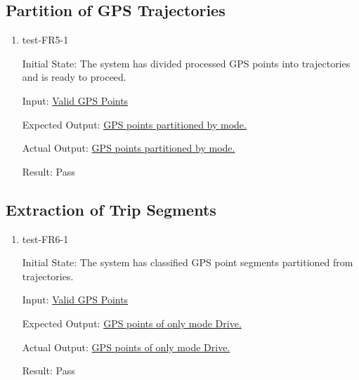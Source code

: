 \documentclass[12pt, titlepage]{article}
\begin{document}
\subsection{Partition of GPS Trajectories}
\begin{enumerate}
    \item test-FR5-1\label{test-FR5-1}
    
    Initial State: The system has divided processed GPS points into trajectories and is ready to proceed.
    
    Input: \href{https://github.com/paezha/PyERT-BLACK/blob/rev0-test/quarto-example/data/sample-gps/sample-gps-1.csv}{Valid GPS Points}
    
    Expected Output: \href{https://github.com/paezha/PyERT-BLACK/blob/rev0-test/test/test_data/fr-tests/fr5-1-expected.csv}{GPS points partitioned by mode.}
    
    Actual Output: \href{https://github.com/paezha/PyERT-BLACK/blob/rev0-test/test/test_data/fr-tests/fr5-1-out.csv}{GPS points partitioned by mode.}
    
    Result: Pass
\end{enumerate}

\subsection{Extraction of Trip Segments}
\begin{enumerate}
    \item test-FR6-1\label{test-FR6-1}
    
    Initial State: The system has classified GPS point segments partitioned from trajectories.
    
    Input: \href{https://github.com/paezha/PyERT-BLACK/blob/rev0-test/quarto-example/data/sample-gps/sample-gps-1.csv}{Valid GPS Points}
    
    Expected Output: \href{https://github.com/paezha/PyERT-BLACK/blob/rev0-test/test/test_data/fr-tests/fr6-1-expected.csv}{GPS points of only mode Drive.}
    
    Actual Output: \href{https://github.com/paezha/PyERT-BLACK/blob/rev0-test/test/test_data/fr-tests/fr6-1-out.csv}{GPS points of only mode Drive.}
    
    Result: Pass
\end{enumerate}
\end{document}
